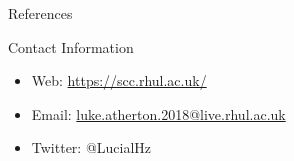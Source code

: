 \documentclass[final]{beamer}
\newlength{\onecolwid}
\begin{document}
\begin{frame}[t]
\begin{columns}[t]
\begin{column}{\onecolwid}
\begin{block}{References}
\end{block}



\begin{alertblock}{Contact Information}

\begin{itemize}
\item Web: \href{https://scc.rhul.ac.uk/}{https://scc.rhul.ac.uk/}
\item Email: \href{luke.atherton.2018@live.rhul.ac.uk}{luke.atherton.2018@live.rhul.ac.uk}
\item Twitter: @LucialHz
\end{itemize}

\end{alertblock}


\end{column} %

\end{columns} %

\end{frame} %
\end{document}
